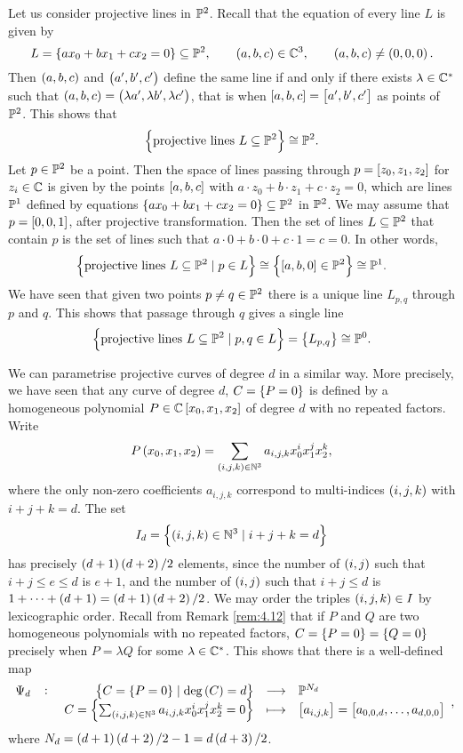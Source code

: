 \begin{example}
Let us consider projective lines in $ \P^2 $. Recall that the equation of every line $ L $ is given by
$$ L = \cbr{ax_0 + bx_1 + cx_2 = 0} \subseteq \P^2, \qquad \br{a, b, c} \in \C^3, \qquad \br{a, b, c} \ne \br{0, 0, 0}. $$
Then $ \br{a, b, c} $ and $ \br{a', b', c'} $ define the same line if and only if there exists $ \lambda \in \C^* $ such that $ \br{a, b, c} = \br{\lambda a', \lambda b', \lambda c'} $, that is when $ \sbr{a, b, c} = \sbr{a', b', c'} $ as points of $ \P^2 $. This shows that
$$ \cbr{\text{projective lines} \ L \subseteq \P^2} \cong \P^2. $$
Let $ p \in \P^2 $ be a point. Then the space of lines passing through $ p = \sbr{z_0, z_1, z_2} $ for $ z_i \in \C $ is given by the points $ \sbr{a, b, c} $ with $ a \cdot z_0 + b \cdot z_1 + c \cdot z_2 = 0 $, which are lines $ \P^1 $ defined by equations $ \cbr{ax_0 + bx_1 + cx_2 = 0} \subseteq \P^2 $ in $ \P^2 $. We may assume that $ p = \sbr{0, 0, 1} $, after projective transformation. Then the set of lines $ L \subseteq \P^2 $ that contain $ p $ is the set of lines such that $ a \cdot 0 + b \cdot 0 + c \cdot 1 = c = 0 $. In other words,
$$ \cbr{\text{projective lines} \ L \subseteq \P^2 \mid p \in L} \cong \cbr{\sbr{a, b, 0} \in \P^2} \cong \P^1. $$
We have seen that given two points $ p \ne q \in \P^2 $ there is a unique line $ L_{p, q} $ through $ p $ and $ q $. This shows that passage through $ q $ gives a single line
$$ \cbr{\text{projective lines} \ L \subseteq \P^2 \mid p, q \in L} = \cbr{L_{p, q}} \cong \P^0. $$
\end{example}

We can parametrise projective curves of degree $ d $ in a similar way. More precisely, we have seen that any curve of degree $ d $, $ C = \cbr{P = 0} $ is defined by a homogeneous polynomial $ P \in \C\sbr{x_0, x_1, x_2} $ of degree $ d $ with no repeated factors. Write
$$ P\br{x_0, x_1, x_2} = \sum_{\br{i, j, k} \in \N^3} a_{i, j, k}x_0^ix_1^jx_2^k, $$
where the only non-zero coefficients $ a_{i, j, k} $ correspond to multi-indices $ \br{i, j, k} $ with $ i + j + k = d $. The set
$$ I_d = \cbr{\br{i, j, k} \in \N^3 \mid i + j + k = d} $$
has precisely $ \br{d + 1}\br{d + 2} / 2 $ elements, since the number of $ \br{i, j} $ such that $ i + j \le e \le d $ is $ e + 1 $, and the number of $ \br{i, j} $ such that $ i + j \le d $ is $ 1 + \dots + \br{d + 1} = \br{d + 1}\br{d + 2} / 2 $. We may order the triples $ \br{i, j, k} \in I $ by lexicographic order. Recall from Remark \ref{rem:4.12} that if $ P $ and $ Q $ are two homogeneous polynomials with no repeated factors, $ C = \cbr{P = 0} = \cbr{Q = 0} $ precisely when $ P = \lambda Q $ for some $ \lambda \in \C^* $. This shows that there is a well-defined map
$$ \function[\Psi_d]{\cbr{C = \cbr{P = 0} \mid \deg\br{C} = d}}{\P^{N_d}}{C = \cbr{\sum_{\br{i, j, k} \in \N^3} a_{i, j, k}x_0^ix_1^jx_2^k = 0}}{\sbr{a_{i, j, k}} = \sbr{a_{0, 0, d}, \dots, a_{d, 0, 0}}}, $$
where $ N_d = \br{d + 1}\br{d + 2} / 2 - 1 = d\br{d + 3} / 2 $.

